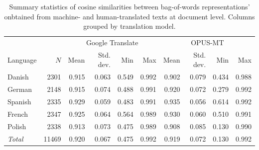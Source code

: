 \begin{table}[!t]

\caption{\label{tab:input_similarity}Summary statistics of cosine similarities between bag-of-words representations' onbtained from machine- and human-translated texts at document level. Columns grouped by translation model.}
\centering
\fontsize{10}{12}\selectfont
\begin{tabular}[t]{lrrrrrrrrr}
\toprule
\multicolumn{2}{c}{ } & \multicolumn{4}{c}{Google Translate} & \multicolumn{4}{c}{OPUS-MT} \\
\cmidrule(l{3pt}r{3pt}){3-6} \cmidrule(l{3pt}r{3pt}){7-10}
Language & $N$ & Mean & Std. dev. & Min & Max & Mean & Std. dev. & Min & Max\\
\midrule
Danish & 2301 & 0.915 & 0.063 & 0.549 & 0.992 & 0.902 & 0.079 & 0.434 & 0.988\\
German & 2148 & 0.915 & 0.074 & 0.488 & 0.991 & 0.920 & 0.072 & 0.279 & 0.992\\
Spanish & 2335 & 0.929 & 0.059 & 0.483 & 0.991 & 0.935 & 0.056 & 0.614 & 0.992\\
French & 2347 & 0.925 & 0.064 & 0.564 & 0.989 & 0.930 & 0.060 & 0.510 & 0.991\\
Polish & 2338 & 0.913 & 0.073 & 0.475 & 0.989 & 0.908 & 0.085 & 0.130 & 0.990\\
\emph{Total} & 11469 & 0.920 & 0.067 & 0.475 & 0.992 & 0.919 & 0.072 & 0.130 & 0.992\\
\bottomrule
\end{tabular}
\end{table}
